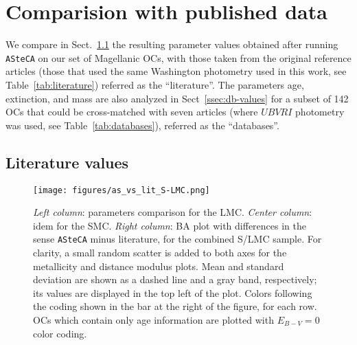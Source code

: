 \documentclass{aa}
\begin{document}

\section{Comparision with published data}
\label{sec:comp-pub-data}

We compare in Sect.~\ref{ssec:lit-values} the resulting parameter values
obtained after running \texttt{ASteCA} on our set of Magellanic OCs, with those
taken from the original reference articles (those that used the same Washington
photometry used in this work, see Table~\ref{tab:literature}) referred as the
``literature''.
%
The parameters age, extinction, and mass are also analyzed in
Sect~\ref{ssec:db-values} for a subset of 142 OCs that could be cross-matched
with seven articles (where $UBVRI$ photometry was used, see
Table~\ref{tab:databases}), referred as the ``databases''.

  

\subsection{Literature values}
\label{ssec:lit-values}

\begin{figure*}
\texttt{[image: figures/as\_vs\_lit\_S-LMC.png]}
\caption{\emph{Left column}: parameters comparison for the LMC.\@
\emph{Center column}: idem for the SMC.\@
\emph{Right column}: BA plot with differences in the sense \texttt{ASteCA} minus
literature, for the combined S/LMC sample. For clarity, a small random scatter
is added to both axes for the metallicity and distance modulus plots. Mean and
standard deviation are shown as a dashed line and a gray band, respectively; its
values are displayed in the top left of the plot.
Colors following the coding shown in the bar at the right of the figure, for
each row.~\cite{Piatti_2011b} OCs which contain only age information are plotted
with $E_{B-V}{=}0$ color coding.}
\label{fig:as_vs_lit}
\end{figure*}
\end{document}
